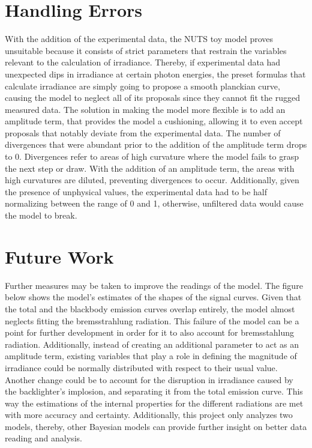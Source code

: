 \documentclass{article}
\begin{document}
\section{Handling Errors}

With the addition of the experimental data, the NUTS toy model proves unsuitable because it consists of strict parameters that restrain the variables relevant to the calculation of irradiance. Thereby, if experimental data had unexpected dips in irradiance at certain photon energies, the preset formulas that calculate irradiance are simply going to propose a smooth planckian curve, causing the model to neglect all of its proposals since they cannot fit the rugged measured data. The solution in making the model more flexible is to add an amplitude term, that provides the model a cushioning, allowing it to even accept proposals that notably deviate from the experimental data. The number of divergences that were abundant prior to the addition of the amplitude term drops to 0. Divergences refer to areas of high curvature where the model fails to grasp the next step or draw. With the addition of an amplitude term, the areas with high curvatures are diluted, preventing divergences to occur. Additionally, given the presence of unphysical values, the experimental data had to be half normalizing between the range of 0 and 1, otherwise, unfiltered data would cause the model to break.   



                  
\section{Future Work}

Further measures may be taken to improve the readings of the model. The figure below shows the model's estimates of the shapes of the signal curves. Given that the total and the blackbody emission curves overlap entirely, the model almost neglects fitting the bremsstrahlung radiation. This failure of the model can be a point for further development in order for it to also account for bremsstahlung radiation. Additionally, instead of creating an additional parameter to act as an amplitude term, existing variables that play a role in defining the magnitude of irradiance could be normally distributed with respect to their usual value. Another change could be to account for the disruption in irradiance caused by the backlighter’s implosion, and separating it from the total emission curve. This way the estimations of the internal properties for the different radiations are met with more accuracy and certainty. Additionally, this project only analyzes two models, thereby, other Bayesian models can provide further insight on better data reading and analysis. 
\end{document}
